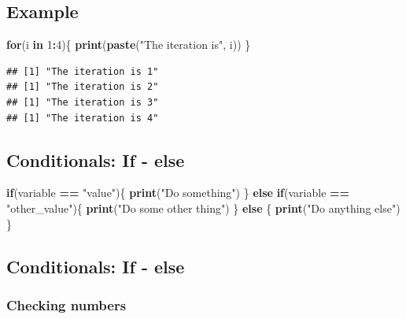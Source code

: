\documentclass[
]{book}
\newenvironment{Shaded}{\begin{snugshade}}{\end{snugshade}}
\newcommand{\ControlFlowTok}[1]{\textcolor[rgb]{0.13,0.29,0.53}{\textbf{#1}}}
\newcommand{\DecValTok}[1]{\textcolor[rgb]{0.00,0.00,0.81}{#1}}
\newcommand{\FunctionTok}[1]{\textcolor[rgb]{0.13,0.29,0.53}{\textbf{#1}}}
\newcommand{\NormalTok}[1]{#1}
\newcommand{\SpecialCharTok}[1]{\textcolor[rgb]{0.81,0.36,0.00}{\textbf{#1}}}
\newcommand{\StringTok}[1]{\textcolor[rgb]{0.31,0.60,0.02}{#1}}
\begin{document}
\subsection{Example}\label{example-1}

\begin{Shaded}
\begin{Highlighting}[]
\ControlFlowTok{for}\NormalTok{(i }\ControlFlowTok{in} \DecValTok{1}\SpecialCharTok{:}\DecValTok{4}\NormalTok{)\{}
  \FunctionTok{print}\NormalTok{(}\FunctionTok{paste}\NormalTok{(}\StringTok{"The iteration is"}\NormalTok{, i))}
\NormalTok{\}}
\end{Highlighting}
\end{Shaded}

\begin{verbatim}
## [1] "The iteration is 1"
## [1] "The iteration is 2"
## [1] "The iteration is 3"
## [1] "The iteration is 4"
\end{verbatim}

\subsection{Conditionals: If - else}\label{conditionals-if---else}

\begin{Shaded}
\begin{Highlighting}[]
\ControlFlowTok{if}\NormalTok{(variable }\SpecialCharTok{==} \StringTok{"value"}\NormalTok{)\{}
  \FunctionTok{print}\NormalTok{(}\StringTok{"Do something"}\NormalTok{)}
\NormalTok{\} }\ControlFlowTok{else} \ControlFlowTok{if}\NormalTok{(variable }\SpecialCharTok{==} \StringTok{"other\_value"}\NormalTok{)\{}
  \FunctionTok{print}\NormalTok{(}\StringTok{"Do some other thing"}\NormalTok{)}
\NormalTok{\} }\ControlFlowTok{else}\NormalTok{ \{}
  \FunctionTok{print}\NormalTok{(}\StringTok{"Do anything else"}\NormalTok{)}
\NormalTok{\}}
\end{Highlighting}
\end{Shaded}

\subsection{Conditionals: If - else}\label{conditionals-if---else-1}

\subsubsection{Checking numbers \textbar{}}\label{checking-numbers}
\end{document}
